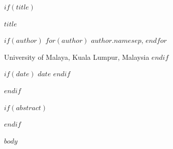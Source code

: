 \documentclass[$if(fontsize)$$fontsize$,$endif$$if(classoption)$$for(classoption)$$classoption$$sep$,$endfor$$endif$]{article}
\begin{document}
$if(title)$
\begin{center}
{\LARGE\bfseries $title$}
\vspace{1em}

$if(author)$
$for(author)$
$author.name$$sep$, $endfor$

\vspace{0.3em}
{\normalsize University of Malaya, Kuala Lumpur, Malaysia}
$endif$

$if(date)$
\vspace{1em}
$date$
$endif$
\end{center}
$endif$

$if(abstract)$
\begin{abstract}
\noindent $abstract$

$if(keywords)$
\vspace{1em}
\noindent\textbf{Keywords:} $keywords$
$endif$

$if(jel)$
\vspace{0.5em}
\noindent\textbf{JEL Classification:} $jel$
$endif$
\end{abstract}
$endif$

\newpage

$body$
\end{document}
